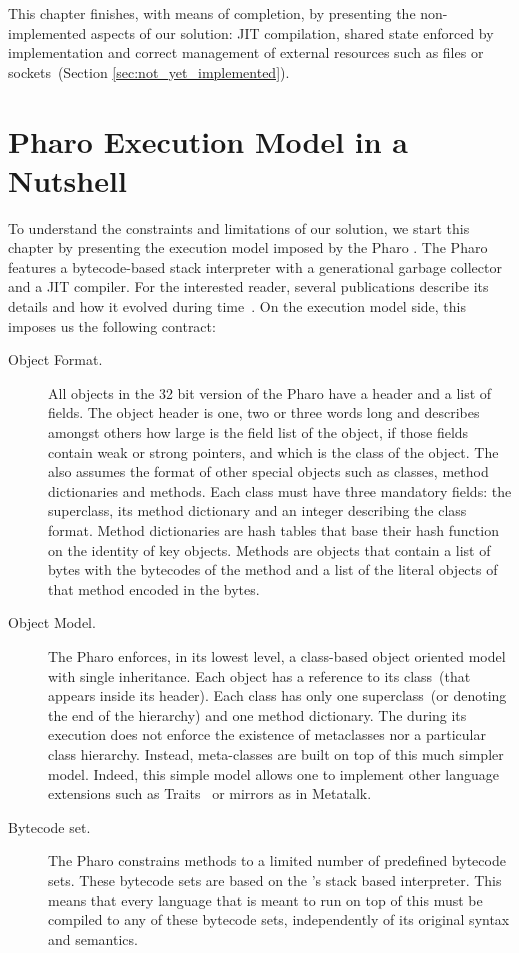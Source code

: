 This chapter finishes, with means of completion, by presenting the non-implemented aspects of our solution: JIT compilation, shared state enforced by \VM implementation and correct management of external resources such as files or sockets~(Section \ref{sec:not_yet_implemented}).

\section{Pharo Execution Model in a Nutshell}\label{sec:pharo_execution_model}

To understand the constraints and limitations of our solution, we start this chapter by presenting the execution model imposed by the Pharo \VM. The Pharo \VM features a bytecode-based stack interpreter with a generational garbage collector and a JIT compiler. For the interested reader, several publications describe its details and how it evolved during time~\cite{Gold83a,Inga97a,Mira11a}. On the execution model side, this \VM imposes us the following contract:

\begin{description}

\item[Object Format.] All objects in the 32 bit version of the Pharo \VM have a header and a list of fields. The object header is one, two or three words long and describes amongst others how large is the field list of the object, if those fields contain weak or strong pointers, and which is the class of the object. The \VM also assumes the format of other special objects such as classes, method dictionaries and methods. Each class must have three mandatory fields: the superclass, its method dictionary and an integer describing the class format. Method dictionaries are hash tables that base their hash function on the identity of key objects. Methods are objects that contain a list of bytes with the bytecodes of the method and a list of the literal objects of that method encoded in the bytes.

\item[Object Model.] The Pharo \VM enforces, in its lowest level, a class-based object oriented model with single inheritance. Each object has a reference to its class~(that appears inside its header). Each class has only one superclass~(or  denoting the end of the hierarchy) and one method dictionary. The \VM during its execution does not enforce the existence of metaclasses nor a particular class hierarchy. Instead, meta-classes are built on top of this much simpler model. Indeed, this simple model allows one to implement other language extensions such as Traits~\cite{Scha03a} or mirrors as in Metatalk\cite{Papo11a}.

\item[Bytecode set.] The Pharo \VM constrains methods to a limited number of predefined bytecode sets. These bytecode sets are based on the \VM's stack based interpreter. This means that every language that is meant to run on top of this \VM must be compiled to any of these bytecode sets, independently of its original syntax and semantics. 

\end{description}

